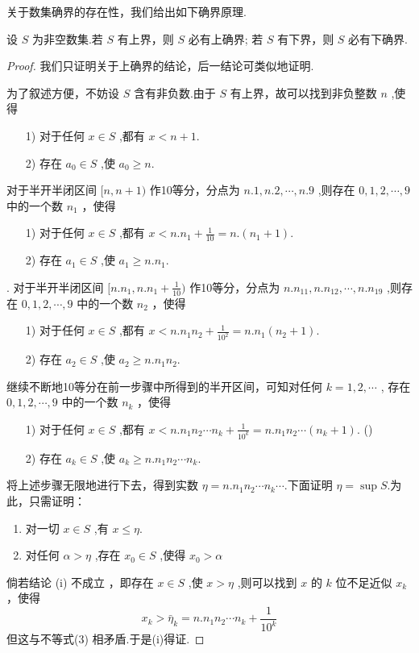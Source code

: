 关于数集确界的存在性，我们给出如下确界原理.

\begin{theorem}[确界原理]
    设 $S$ 为非空数集.若 $S$ 有上界，则 $S$ 必有上确界; 若 $S$ 有下界，则 $S$ 必有下确界.
\end{theorem}

\begin{proof}
    \renewcommand{\theenumi}{\roman{enumi}}
    \renewcommand{\labelenumi}{\normalfont (\theenumi)}
    我们只证明关于上确界的结论，后一结论可类似地证明.

    为了叙述方便，不妨设 $S$ 含有非负数.由于 $S$ 有上界，故可以找到非负整数 $n$ ,使得
    \begin{enumerate}
        \item[1)] 对于任何 $x\in S$ ,都有 $x<n+1$.
        \item[2)] 存在 $a_0\in S$ ,使 $a_0\ge n$.
    \end{enumerate}
    对于半开半闭区间 $[n,n+1)$ 作10等分，分点为 $n.1,n.2,\cdots,n.9$ ,则存在 $0,1,2,\cdots,9$ 中的一个数 $n_1$ ，使得 
    \begin{enumerate}
        \item[1)] 对于任何 $x\in S$ ,都有 $x<n.n_1+\frac{1}{10}=n.(n_1+1)$.
        \item[2)] 存在 $a_1\in S$ ,使 $a_1\ge n.n_1$.
    \end{enumerate}.
    对于半开半闭区间 $[n.n_1,n.n_1+\frac{1}{10})$ 作10等分，分点为 $n.n_11,n.n_12,\cdots,n.n_19$ ,则存在 $0,1,2,\cdots,9$ 中的一个数 $n_2$ ，使得 
    \begin{enumerate}
        \item[1)] 对于任何 $x\in S$ ,都有 $x<n.n_1n_2+\frac{1}{10^2}=n.n_1(n_2+1)$.
        \item[2)] 存在 $a_2\in S$ ,使 $a_2\ge n.n_1n_2$.
    \end{enumerate}
    继续不断地10等分在前一步骤中所得到的半开区间，可知对任何 $k=1,2,\cdots$ ,
    存在 $0,1,2,\cdots,9$ 中的一个数 $n_k$ ，使得 
    \begin{enumerate}
        \item[1)] 对于任何 $x\in S$ ,都有 $x<n.n_1n_2\cdots n_k+\frac{1}{10^k}=n.n_1n_2\cdots(n_k+1)$. \hfill (\theequation{})
        \item[2)] 存在 $a_k\in S$ ,使 $a_k\ge n.n_1n_2\cdots n_k$.
    \end{enumerate}
    
    将上述步骤无限地进行下去，得到实数 $\eta=n.n_1n_2\cdots n_k\cdots$.下面证明 $\eta=\sup S$.为此，只需证明：
    \begin{enumerate}
        \item 对一切 $x\in S$ ,有 $x\le \eta$.
        \item 对任何 $\alpha>\eta$ ,存在 $x_0\in S$ ,使得 $x_0> \alpha$
    \end{enumerate}
    倘若结论 (i) 不成立 ，即存在 $x\in S$ ,使 $x>\eta$ ,则可以找到 $x$ 的 $k$ 位不足近似 $x_k$ ，使得
    \[
    x_k > \bar \eta_k = n.n_1n_2\cdots n_k+\frac{1}{10^k}
    \]
    但这与不等式(3) 相矛盾.于是(i)得证.


\end{proof}
